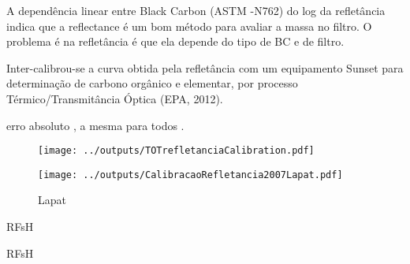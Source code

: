 A dependência linear entre Black Carbon (ASTM -N762) do log da refletância indica
que a reflectance é um bom método para avaliar a massa no filtro. 
O problema é na refletância é que ela depende do tipo de BC e de filtro. 

Inter-calibrou-se a curva obtida pela refletância com um equipamento 
Sunset para determinação de carbono orgânico e elementar, 
por processo Térmico/Transmitância Óptica (EPA, 2012).

erro absoluto , a mesma para todos .

\begin{figure}[H]
\begin{center}
  \texttt{[image: ../outputs/TOTrefletanciaCalibration.pdf]}
  \caption{}
\end{center}
\end{figure}
  
\begin{figure}[H]
\begin{center}
  \texttt{[image: ../outputs/CalibracaoRefletancia2007Lapat.pdf]}
  \caption{Lapat }
\end{center}
\end{figure}

\begin{table}[H]
  \centering
  \caption{RFsH}
  
\end{table}

\begin{table}[H]
  \centering
  \caption{RFsH}
  
\end{table}




